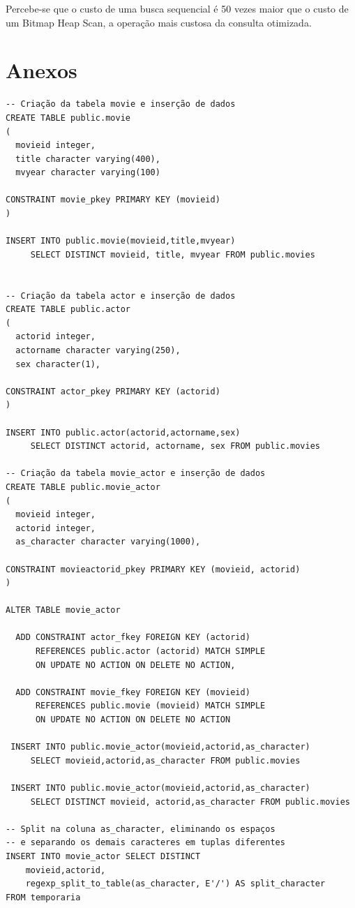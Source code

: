 \documentclass[
	12pt,				%
	oneside,			%
	a4paper,			%
	brazil				%
	]{abntex2}
\begin{document}
Percebe-se que o custo de uma busca sequencial é 50 vezes maior que o custo de um Bitmap Heap Scan, a operação mais custosa da consulta otimizada.


\newpage




\chapter{Anexos}

\begin{lstlisting}
-- Criação da tabela movie e inserção de dados
CREATE TABLE public.movie
(
  movieid integer,
  title character varying(400),
  mvyear character varying(100)

CONSTRAINT movie_pkey PRIMARY KEY (movieid)
)

INSERT INTO public.movie(movieid,title,mvyear)
     SELECT DISTINCT movieid, title, mvyear FROM public.movies
     
     
-- Criação da tabela actor e inserção de dados
CREATE TABLE public.actor
(
  actorid integer,
  actorname character varying(250),
  sex character(1),

CONSTRAINT actor_pkey PRIMARY KEY (actorid)
)

INSERT INTO public.actor(actorid,actorname,sex)
     SELECT DISTINCT actorid, actorname, sex FROM public.movies

-- Criação da tabela movie_actor e inserção de dados
CREATE TABLE public.movie_actor
(
  movieid integer,
  actorid integer,
  as_character character varying(1000),

CONSTRAINT movieactorid_pkey PRIMARY KEY (movieid, actorid)
)

ALTER TABLE movie_actor

  ADD CONSTRAINT actor_fkey FOREIGN KEY (actorid)
      REFERENCES public.actor (actorid) MATCH SIMPLE
      ON UPDATE NO ACTION ON DELETE NO ACTION,

  ADD CONSTRAINT movie_fkey FOREIGN KEY (movieid)
      REFERENCES public.movie (movieid) MATCH SIMPLE
      ON UPDATE NO ACTION ON DELETE NO ACTION
      
 INSERT INTO public.movie_actor(movieid,actorid,as_character)
     SELECT movieid,actorid,as_character FROM public.movies 

 INSERT INTO public.movie_actor(movieid,actorid,as_character)
     SELECT DISTINCT movieid, actorid,as_character FROM public.movies 

-- Split na coluna as_character, eliminando os espaços 
-- e separando os demais caracteres em tuplas diferentes
INSERT INTO movie_actor SELECT DISTINCT
    movieid,actorid, 
    regexp_split_to_table(as_character, E'/') AS split_character
FROM temporaria


\end{lstlisting}
\end{document}
